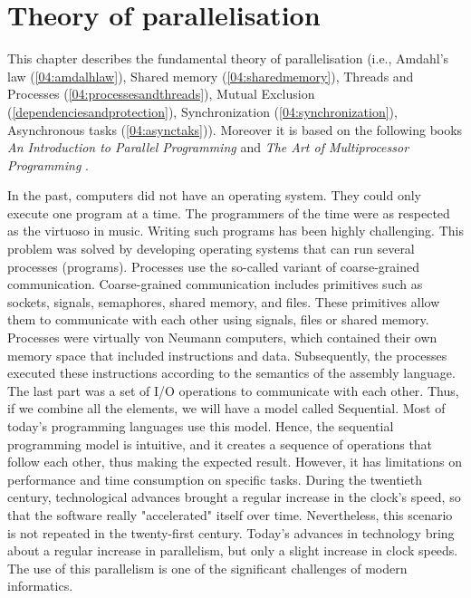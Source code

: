 \chapter{Theory of parallelisation}
\label{03:chapter:title}

This chapter describes the fundamental theory of parallelisation (i.e., Amdahl's law (\ref{04:amdalhlaw}), Shared memory (\ref{04:sharedmemory}), Threads and Processes (\ref{04:processesandthreads}), Mutual Exclusion (\ref{dependenciesandprotection}), Synchronization (\ref{04:synchronization}), Asynchronous tasks (\ref{04:asynctaks})). Moreover it is based on the following books \emph{An Introduction to Parallel Programming} \cite{introductionToParallelProgramming} and \emph{The Art of Multiprocessor Programming} \cite{artOfMultiprocessorProgramming}.

In the past, computers did not have an operating system. They could only execute one program at a time. The programmers of the time were as respected as the virtuoso in music. Writing such programs has been highly challenging. This problem was solved by developing operating systems that can run several processes (programs).
Processes use the so-called variant of coarse-grained communication.
Coarse-grained communication includes primitives such as sockets, signals, semaphores, shared memory, and files. These primitives allow them to communicate with each other using signals, files or shared memory.  Processes were virtually von Neumann computers, which contained their own memory space that included instructions and data. Subsequently, the processes executed these instructions according to the semantics of the assembly language. The last part was a set of I/O operations to communicate with each other. Thus, if we combine all the elements, we will have a model called Sequential. Most of today's programming languages use this model.  Hence, the sequential programming model is intuitive, and it creates a sequence of operations that follow each other, thus making the expected result. However, it has limitations on performance and time consumption on specific tasks. During the twentieth century, technological advances brought a regular increase in the clock's speed, so that the software really "accelerated" itself over time. Nevertheless, this scenario is not repeated in the twenty-first century. Today's advances in technology bring about a regular increase in parallelism, but only a slight increase in clock speeds. The use of this parallelism is one of the significant challenges of modern informatics.

